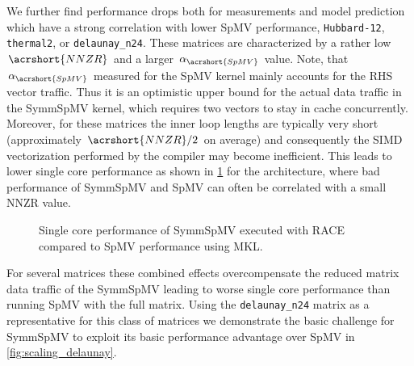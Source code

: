 We further find performance drops both for measurements and model prediction which have a strong correlation with lower \acrshort{SpMV} performance, \eg \texttt{Hubbard-12}, \texttt{thermal2}, or \texttt{delaunay\_n24}. These matrices are characterized by a rather low $\acrshort{NNZR}$ and a larger $\alpha_{\acrshort{SpMV}}$ value. Note, that  $\alpha_{\acrshort{SpMV}}$ measured for the \acrshort{SpMV}  kernel mainly accounts for the RHS vector traffic. Thus it is an optimistic upper bound for the actual data traffic in the \acrshort{SymmSpMV} kernel, which requires two vectors to stay in cache concurrently. Moreover, for these matrices the inner loop lengths are typically very short (approximately $\acrshort{NNZR}/2$ on average) and consequently the SIMD vectorization performed by the compiler may become inefficient. This leads to lower single core performance as shown in \cref{fig:SpMV_vs_SymmSpMV_single_core} for the \SKX architecture, where bad performance of \acrshort{SymmSpMV}  and \acrshort{SpMV} can often be correlated with a small \acrshort{NNZR} value. 
%
 \begin{figure}[tbp]
 	\centering
 	\caption{Single core performance of \acrshort{SymmSpMV} executed with \acrshort{RACE} compared to \acrshort{SpMV} performance using \acrshort{MKL}.}
 	\label{fig:SpMV_vs_SymmSpMV_single_core}
 \end{figure}
 For several matrices these combined effects overcompensate the reduced matrix data traffic of the \acrshort{SymmSpMV} leading to worse single core performance than running \acrshort{SpMV} with the full matrix. Using the \texttt{delaunay\_n24} matrix as a representative for this class of matrices we demonstrate the basic challenge for \acrshort{SymmSpMV} to exploit its basic performance advantage over \acrshort{SpMV} in \cref{fig:scaling_delaunay}.
